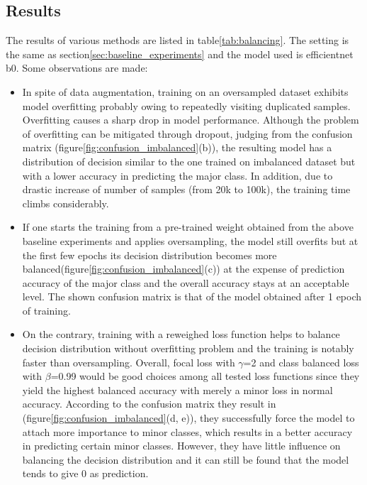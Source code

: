 \documentclass[../main.tex]{subfiles}
\begin{document}
\subsection{Results}
The results of various methods are listed in table\ref{tab:balancing}. The setting is the same as section\ref{sec:baseline_experiments} and the model used is efficientnet b0. Some observations are made:
\begin{itemize}
  \item In spite of data augmentation, training on an oversampled dataset exhibits model overfitting probably owing to repeatedly visiting duplicated samples. Overfitting causes a sharp drop in model performance. Although the problem of overfitting can be mitigated through dropout, judging from the confusion matrix (figure\ref{fig:confusion_imbalanced}(b)), the resulting model has a distribution of decision similar to the one trained on imbalanced dataset but with a lower accuracy in predicting the major class. In addition, due to drastic increase of number of samples (from 20k to 100k), the training time climbs considerably. 
  \item If one starts the training from a pre-trained weight obtained from the above baseline experiments and applies oversampling, the model still overfits but at the first few epochs its decision distribution becomes more balanced(figure\ref{fig:confusion_imbalanced}(c)) at the expense of prediction accuracy of the major class and the overall accuracy stays at an acceptable level. The shown confusion matrix is that of the model obtained after 1 epoch of training.
  \item On the contrary, training with a reweighed loss function helps to balance decision distribution without overfitting problem and the training is notably faster than oversampling. Overall, focal loss with $\gamma$=2 and class balanced loss with $\beta$=0.99 would be good choices among all tested loss functions since they yield the highest balanced accuracy with merely a minor loss in normal accuracy. According to the confusion matrix they result in (figure\ref{fig:confusion_imbalanced}(d, e)), they successfully force the model to attach more importance to minor classes, which results in a better accuracy in predicting certain minor classes. However, they have little influence on balancing the decision distribution and it can still be found that the model tends to give 0 as prediction.
\end{itemize}
\end{document}
